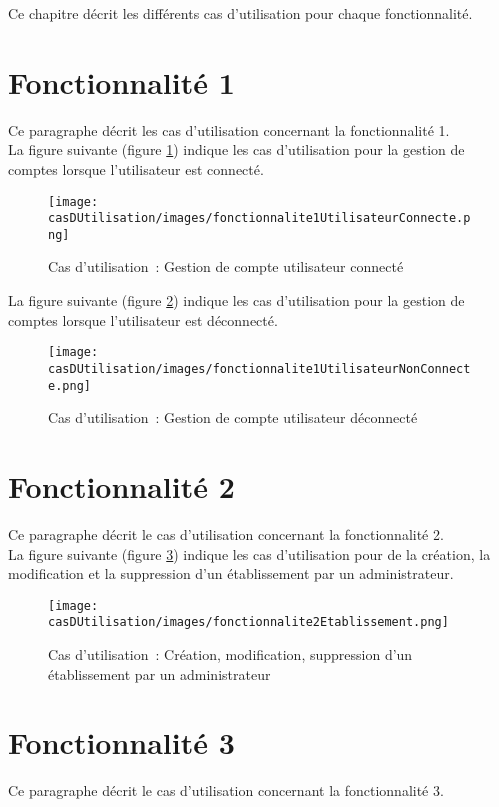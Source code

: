 Ce chapitre décrit les différents cas d'utilisation pour chaque fonctionnalité.


\section{Fonctionnalité 1}
Ce paragraphe décrit les cas d'utilisation concernant la fonctionnalité 1. \\

La figure suivante (figure \ref{diagrammeCasUtilisation1-1}) indique les cas d'utilisation pour la gestion de comptes lorsque l'utilisateur est connecté.
\begin{figure}[H]
	\centering
	\texttt{[image: casDUtilisation/images/fonctionnalite1UtilisateurConnecte.png]}
	\caption{Cas d'utilisation~: Gestion de compte utilisateur connecté }
	\label{diagrammeCasUtilisation1-1}
\end{figure}

La figure suivante (figure \ref{diagrammeCasUtilisation1-2}) indique les cas d'utilisation pour la gestion de comptes lorsque l'utilisateur est déconnecté.
\begin{figure}[H]
	\centering
	\texttt{[image: casDUtilisation/images/fonctionnalite1UtilisateurNonConnecte.png]}
	\caption{Cas d'utilisation~: Gestion de compte utilisateur déconnecté}
	\label{diagrammeCasUtilisation1-2}
\end{figure}

\section{Fonctionnalité 2}
Ce paragraphe décrit le cas d'utilisation concernant la fonctionnalité 2. \\

La figure suivante (figure \ref{diagrammeCasUtilisation2}) indique les cas d'utilisation pour de la création, la modification et la suppression d'un établissement par un administrateur.
\begin{figure}[H]
	\centering
	\texttt{[image: casDUtilisation/images/fonctionnalite2Etablissement.png]}
	\caption{Cas d'utilisation~: Création, modification, suppression d'un établissement par un administrateur}
	\label{diagrammeCasUtilisation2}
\end{figure}

\section{Fonctionnalité 3}
Ce paragraphe décrit le cas d'utilisation concernant la fonctionnalité 3. \\

